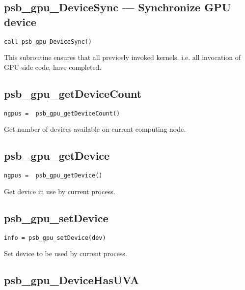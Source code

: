 \subsection*{psb\_gpu\_DeviceSync ---  Synchronize GPU device}

\begin{verbatim}
call psb_gpu_DeviceSync()
\end{verbatim}

This subroutine ensures that all previosly invoked kernels, i.e. all
invocation of GPU-side code, have completed.


\subsection*{psb\_gpu\_getDeviceCount }

\begin{verbatim}
ngpus =  psb_gpu_getDeviceCount()
\end{verbatim}

Get number of devices available on current computing node. 

\subsection*{psb\_gpu\_getDevice }

\begin{verbatim}
ngpus =  psb_gpu_getDevice()
\end{verbatim}

Get  device in use by current process. 

\subsection*{psb\_gpu\_setDevice }

\begin{verbatim}
info = psb_gpu_setDevice(dev)
\end{verbatim}

Set  device to be used  by current process. 

\subsection*{psb\_gpu\_DeviceHasUVA }

